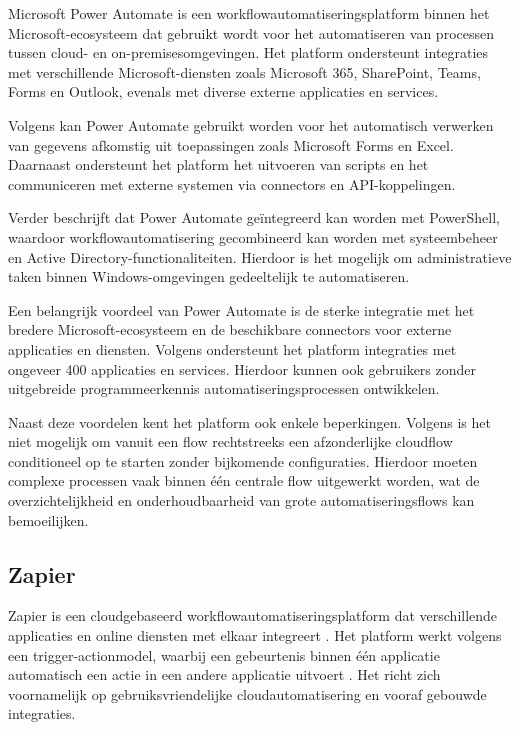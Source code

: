 Microsoft Power Automate is een workflowautomatiseringsplatform binnen het Microsoft-ecosysteem dat gebruikt wordt voor het automatiseren van processen tussen cloud- en on-premisesomgevingen. Het platform ondersteunt integraties met verschillende Microsoft-diensten zoals Microsoft 365, SharePoint, Teams, Forms en Outlook, evenals met diverse externe applicaties en services.

Volgens \textcite{Microsoft2024} kan Power Automate gebruikt worden voor het automatisch verwerken van gegevens afkomstig uit toepassingen zoals Microsoft Forms en Excel. Daarnaast ondersteunt het platform het uitvoeren van scripts en het communiceren met externe systemen via connectors en API-koppelingen.

Verder beschrijft \textcite{Microsoft2021} dat Power Automate geïntegreerd kan worden met PowerShell, waardoor workflowautomatisering gecombineerd kan worden met systeembeheer en Active Directory-functionaliteiten. Hierdoor is het mogelijk om administratieve taken binnen Windows-omgevingen gedeeltelijk te automatiseren.

Een belangrijk voordeel van Power Automate is de sterke integratie met het bredere Microsoft-ecosysteem en de beschikbare connectors voor externe applicaties en diensten. Volgens \textcite{Botcity2025} ondersteunt het platform integraties met ongeveer 400 applicaties en services. Hierdoor kunnen ook gebruikers zonder uitgebreide programmeerkennis automatiseringsprocessen ontwikkelen.

Naast deze voordelen kent het platform ook enkele beperkingen. Volgens \textcite{Kothari2026} is het niet mogelijk om vanuit een flow rechtstreeks een afzonderlijke cloudflow conditioneel op te starten zonder bijkomende configuraties. Hierdoor moeten complexe processen vaak binnen één centrale flow uitgewerkt worden, wat de overzichtelijkheid en onderhoudbaarheid van grote automatiseringsflows kan bemoeilijken.

\subsection{Zapier}

Zapier is een cloudgebaseerd workflowautomatiseringsplatform dat verschillende applicaties en online diensten met elkaar integreert \autocite{Cosar2021}. Het platform werkt volgens een trigger-actionmodel, waarbij een gebeurtenis binnen één applicatie automatisch een actie in een andere applicatie uitvoert \autocite{Jobtoolz}. Het richt zich voornamelijk op gebruiksvriendelijke cloudautomatisering en vooraf gebouwde integraties.

